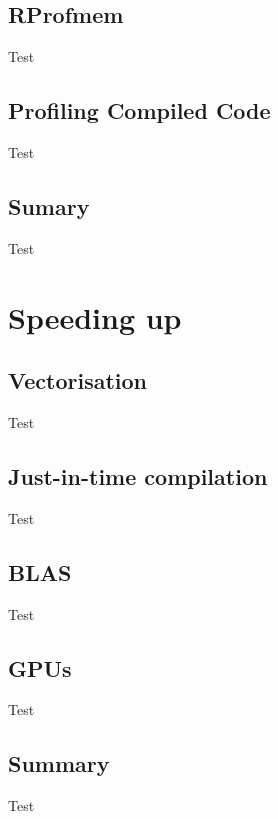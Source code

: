 \documentclass    [10pt, compress]{beamer}
\begin{document}
\subsection{RProfmem}
\begin{frame}Test\end{frame}
\subsection[Profiling]{Profiling Compiled Code}
\begin{frame}Test\end{frame}
\subsection{Sumary}
\begin{frame}Test\end{frame}

\section{Speeding up}
\subsection[Vec]{Vectorisation}
\begin{frame}Test\end{frame}
\subsection[Ra]{Just-in-time compilation}
\begin{frame}Test\end{frame}
\subsection{BLAS}
\begin{frame}Test\end{frame}
\subsection{GPUs}
\begin{frame}Test\end{frame}
\subsection{Summary}
\begin{frame}Test\end{frame}
\end{document}
